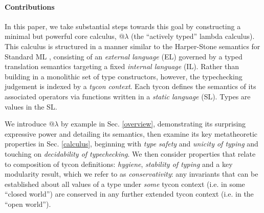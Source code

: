 \documentclass{llncs}
\begin{document}
\paragraph{Contributions} In this paper, we take substantial steps towards this goal by  constructing a minimal but powerful core calculus, @$\lambda$ (the ``actively typed'' lambda calculus). %
This calculus is structured in a manner similar to the Harper-Stone semantics for Standard ML \cite{Harper00atype-theoretic}, consisting of an \emph{external language} (EL) governed by a {typed translation semantics} targeting a fixed \emph{internal language} (IL). 
Rather than building in a monolithic set of type constructors, however, the typechecking judgement is indexed by a \emph{tycon context}. Each tycon defines the semantics of its associated operators via functions written in a \emph{static language} (SL). Types are values in the SL.%

We introduce @$\lambda$ by example in Sec. \ref{overview}, demonstrating its surprising expressive power and detailing its semantics, then examine its key metatheoretic properties in Sec. \ref{calculus}, beginning with \emph{type safety} and \emph{unicity of typing} and touching on  \emph{decidability of typechecking}. We then consider properties that relate to composition of tycon definitions: \emph{hygiene}, \emph{stability of typing} and a key modularity result, which we refer to as  \emph{conservativity}: any invariants that can be established about all values of a type under \emph{some} tycon context (i.e. in some  ``closed world'') are conserved in any further extended tycon context (i.e. in the ``open world''). 
\end{document}
